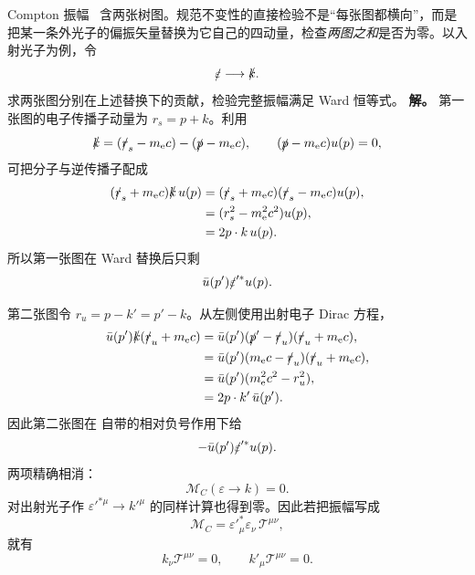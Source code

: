 
\begin{exbox}
Compton 振幅~ 含两张树图。规范不变性的直接检验不是“每张图都横向”，而是把某一条外光子的偏振矢量替换为它自己的四动量，检查\emph{两图之和}是否为零。以入射光子为例，令
\begin{equation*}
 \slashed\varepsilon\longrightarrow\slashed k.
\end{equation*}
求两张图分别在上述替换下的贡献，检验完整振幅满足 Ward 恒等式。
\textbf{解。} 第一张图的电子传播子动量为 $r_s=p+k$。利用
\begin{equation*}
 \slashed k
 =(\slashed r_s-m_{\mathrm e} c)-(\slashed p-m_{\mathrm e} c),
 \qquad
 (\slashed p-m_{\mathrm e} c)u(p)=0,
\end{equation*}
可把分子与逆传播子配成
\begin{align*}
 (\slashed r_s+m_{\mathrm e} c)\slashed k\,u(p)
 &=(\slashed r_s+m_{\mathrm e} c)(\slashed r_s-m_{\mathrm e} c)u(p),\\
 &=(r_s^2-m_{\mathrm e}^2c^2)u(p),\\
 &=2p\cdot k\,u(p).
\end{align*}
所以第一张图在 Ward 替换后只剩
\begin{equation*}
 \bar u(p')\slashed\varepsilon'^{*}u(p).
\end{equation*}

第二张图令 $r_u=p-k'=p'-k$。从左侧使用出射电子 Dirac 方程，
\begin{align*}
 \bar u(p')\slashed k(\slashed r_u+m_{\mathrm e} c)
 &=\bar u(p')(\slashed p'-\slashed r_u)(\slashed r_u+m_{\mathrm e} c),\\
 &=\bar u(p')(m_{\mathrm e} c-\slashed r_u)(\slashed r_u+m_{\mathrm e} c),\\
 &=\bar u(p')(m_{\mathrm e}^2c^2-r_u^2),\\
 &=2p\cdot k'\,\bar u(p').
\end{align*}
因此第二张图在 自带的相对负号作用下给
\begin{equation*}
 -\bar u(p')\slashed\varepsilon'^{*}u(p).
\end{equation*}
两项精确相消：
\begin{equation}
 {
 \mathcal M_C(\varepsilon\to k)=0.}
 \label{eq:compton-ward-incoming-dp64}
\end{equation}
对出射光子作 $\varepsilon'^{*\mu}\to k'^{\mu}$ 的同样计算也得到零。因此若把振幅写成
\begin{equation*}
 \mathcal M_C
 =\varepsilon'^{*}_{\mu}\varepsilon_\nu\,
 \mathcal T^{\mu\nu},
\end{equation*}
就有
\begin{equation}
 {
 k_\nu\mathcal T^{\mu\nu}=0,
 \qquad
 k'_\mu\mathcal T^{\mu\nu}=0.}
 \label{eq:compton-double-ward-dp64}
\end{equation}


\end{exbox}
